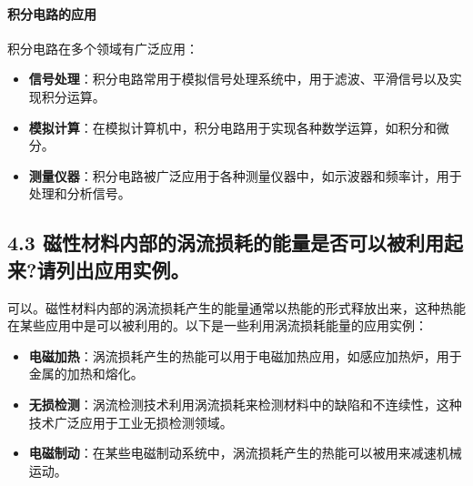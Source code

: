 \documentclass[]{../template/Report}%
\begin{document}
\begin{fullreportonly}
\paragraph{积分电路的应用}

积分电路在多个领域有广泛应用：
\begin{itemize}
    \item \textbf{信号处理}：积分电路常用于模拟信号处理系统中，用于滤波、平滑信号以及实现积分运算。
    \item \textbf{模拟计算}：在模拟计算机中，积分电路用于实现各种数学运算，如积分和微分。
    \item \textbf{测量仪器}：积分电路被广泛应用于各种测量仪器中，如示波器和频率计，用于处理和分析信号。
\end{itemize}

\subsection*{4.3 磁性材料内部的涡流损耗的能量是否可以被利用起来?请列出应用实例。}
可以。磁性材料内部的涡流损耗产生的能量通常以热能的形式释放出来，这种热能在某些应用中是可以被利用的。以下是一些利用涡流损耗能量的应用实例：
\begin{itemize}
    \item \textbf{电磁加热}：涡流损耗产生的热能可以用于电磁加热应用，如感应加热炉，用于金属的加热和熔化。
    \item \textbf{无损检测}：涡流检测技术利用涡流损耗来检测材料中的缺陷和不连续性，这种技术广泛应用于工业无损检测领域。
    \item \textbf{电磁制动}：在某些电磁制动系统中，涡流损耗产生的热能可以被用来减速机械运动。
\end{itemize}
\end{fullreportonly}
\insertnotes
\end{document}
